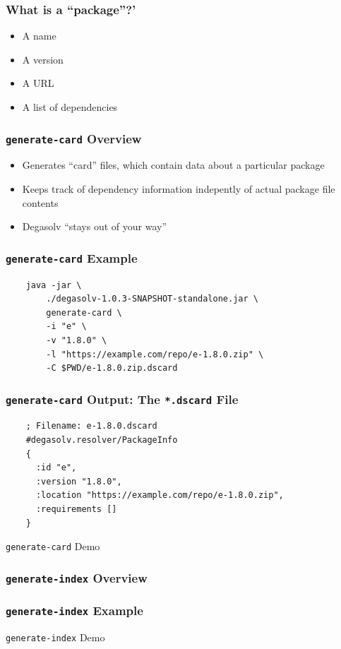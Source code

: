\documentclass{beamer}
\begin{document}
\begin{frame}
  \frametitle{What is a ``package''?'}
  \begin{itemize}
  \item A name
  \item A version
  \item A URL
  \item A list of dependencies
  \end{itemize}
\end{frame}
\begin{frame}
  \frametitle{\texttt{generate-card} Overview}
  \begin{itemize}
  \item Generates ``card'' files, which contain data about a particular package
  \item Keeps track of dependency information indepently of actual package file contents
  \item Degasolv ``stays out of your way''
  \end{itemize}
\end{frame}
\begin{frame}[fragile]
  \frametitle{\texttt{generate-card} Example}
  \begin{verbatim}
    java -jar \
        ./degasolv-1.0.3-SNAPSHOT-standalone.jar \
        generate-card \
        -i "e" \
        -v "1.8.0" \
        -l "https://example.com/repo/e-1.8.0.zip" \
        -C $PWD/e-1.8.0.zip.dscard
  \end{verbatim}
\end{frame}
\begin{frame}[fragile]
  \frametitle{\texttt{generate-card} Output: The \texttt{*.dscard} File}
  \begin{verbatim}
    ; Filename: e-1.8.0.dscard
    #degasolv.resolver/PackageInfo
    {
      :id "e",
      :version "1.8.0",
      :location "https://example.com/repo/e-1.8.0.zip",
      :requirements []
    }
  \end{verbatim}
\end{frame}
\begin{frame}
  \centerline{\color{blue}\Large \texttt{generate-card} Demo}
\end{frame}
\begin{frame}
  \frametitle{\texttt{generate-index} Overview}
\end{frame}
\begin{frame}
  \frametitle{\texttt{generate-index} Example}
\end{frame}
\begin{frame}
  \centerline{\color{blue}\Large \texttt{generate-index} Demo}
\end{frame}
\end{document}
